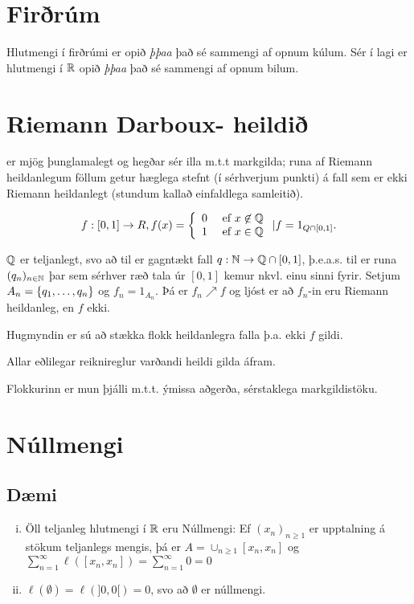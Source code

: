 \documentclass[12pt]{book}
\begin{document}
\section{Firðrúm}
Hlutmengi í firðrúmi er opið \emph{þþaa} það sé sammengi af opnum kúlum. Sér í lagi er hlutmengi í $\mathbb{R}$ opið \emph{þþaa} það sé sammengi af opnum bilum.

\section{Riemann Darboux- heildið}
er mjög þunglamalegt og hegðar sér illa m.t.t markgilda; runa af Riemann heildanlegum föllum getur hæglega stefnt (í sérhverjum punkti) á fall sem er ekki Riemann heildanlegt (stundum kallað einfaldlega samleitið).

\begin{daemi}
\[f: [0,1] \to R, f(x) = \left\{ \begin{array}{l l} 0 & \text{ ef } x \not\in \mathbb{Q} \\ 1 & \text{ ef } x \in \mathbb{Q} \end{array} \right.  | f = 1_{Q \cap [0,1]}. \]

$\mathbb{Q}$ er teljanlegt, svo að til er gagntækt fall $q: \mathbb{N} \to \mathbb{Q} \cap [0,1]$, þ.e.a.s. til er runa $(q_n)_{n \in \mathbb{N}}$ þar sem sérhver ræð tala úr $[0,1]$ kemur nkvl. einu sinni fyrir. Setjum $A_n = \{q_1, \dotsc, q_n\}$ og $f_n = 1_{A_n}$. Þá er $f_n \nearrow f$ og ljóst er að $f_n$-in eru Riemann heildanleg, en $f$ ekki.

Hugmyndin er sú að stækka flokk heildanlegra falla þ.a. ekki $f$ gildi.

Allar eðlilegar reiknireglur varðandi heildi gilda áfram.

Flokkurinn er mun þjálli m.t.t. ýmissa aðgerða, sérstaklega markgildistöku.
\end{daemi}

\section{Núllmengi}
\subsection{Dæmi}
\begin{enumerate}[i)]
\item Öll teljanleg hlutmengi í $\mathbb{R}$ eru Núllmengi: Ef $(x_n)_{n \geq 1}$ er upptalning á stökum teljanlegs mengis, þá er $A = \cup_{n \geq 1} [x_n, x_n]$ og $\sum_{n = 1}^{\infty} \ell([x_n,x_n]) = \sum_{n=1}^{\infty} 0 = 0$
\item $\ell(\emptyset) = \ell(]0,0[) = 0$, svo að $\emptyset$ er núllmengi.
\end{enumerate}
\end{document}
